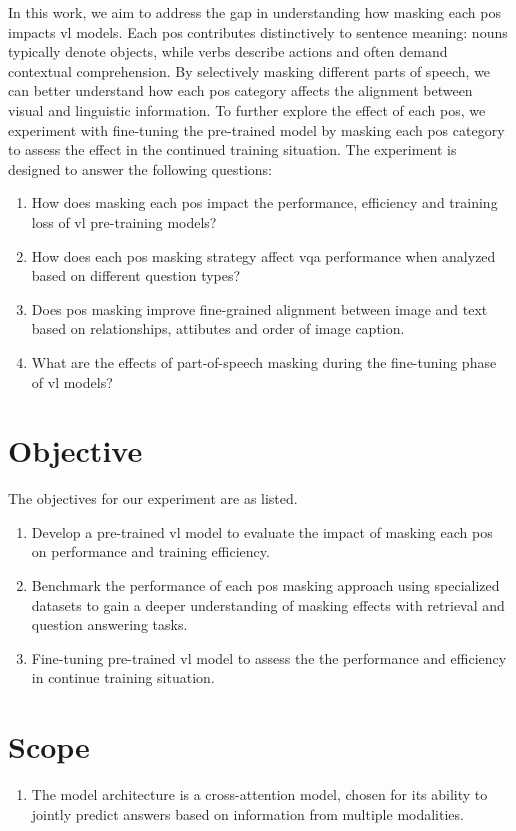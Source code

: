 In this work, we aim to address the gap in understanding how masking each \acrfull{pos} impacts \acrshort{vl} models.
Each \acrshort{pos} contributes distinctively to sentence meaning: nouns typically denote objects, while verbs describe actions and often demand contextual comprehension.
By selectively masking different parts of speech, we can better understand how each \acrshort{pos} category affects the alignment between visual and linguistic information.
To further explore the effect of each \acrshort{pos}, we experiment with fine-tuning the pre-trained model by masking each \acrshort{pos} category to assess the effect in the continued training situation.
The experiment is designed to answer the following questions:
\begin{enumerate}
    \item How does masking each \acrshort{pos} impact the performance, efficiency and training loss of \acrshort{vl} pre-training models?
    \item How does each \acrshort{pos} masking strategy affect \acrfull{vqa} performance when analyzed based on different question types?
    \item Does \acrshort{pos} masking improve fine-grained alignment between image and text based on relationships, attibutes and order of image caption.
    \item What are the effects of part-of-speech masking during the fine-tuning phase of \acrshort{vl} models?
\end{enumerate}

\section{Objective}
The objectives for our experiment are as listed.
\begin{enumerate}
    \item Develop a pre-trained \acrshort{vl} model to evaluate the impact of masking each \acrshort{pos} on performance and training efficiency.
    \item Benchmark the performance of each \acrshort{pos} masking approach using specialized datasets to gain a deeper understanding of masking effects with retrieval and question answering tasks.
    \item Fine-tuning pre-trained \acrshort{vl} model to assess the the performance and efficiency in continue training situation.
\end{enumerate}

\section{Scope}
\begin{enumerate}
    \item The model architecture is a cross-attention model, chosen for its ability to jointly predict answers based on information from multiple modalities.
\end{enumerate}


